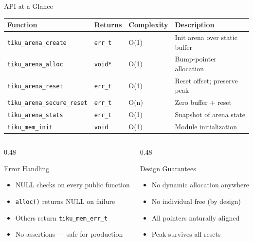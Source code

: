 \documentclass[aspectratio=169, 10pt]{beamer}
\begin{document}
\begin{frame}{API at a Glance}
\begin{table}
\centering
\small
\begin{tabular}{@{}llll@{}}
\toprule
\textbf{Function} & \textbf{Returns} & \textbf{Complexity} & \textbf{Description} \\
\midrule
\texttt{tiku\_arena\_create}  & \texttt{err\_t} & O(1) & Init arena over static buffer \\
\texttt{tiku\_arena\_alloc}   & \texttt{void*}  & O(1) & Bump-pointer allocation \\
\texttt{tiku\_arena\_reset}   & \texttt{err\_t} & O(1) & Reset offset; preserve peak \\
\texttt{tiku\_arena\_secure\_reset} & \texttt{err\_t} & O(n) & Zero buffer + reset \\
\texttt{tiku\_arena\_stats}   & \texttt{err\_t} & O(1) & Snapshot of arena state \\
\texttt{tiku\_mem\_init}      & \texttt{void}   & O(1) & Module initialization \\
\bottomrule
\end{tabular}
\end{table}

\vspace{0.5em}
\begin{columns}[T]
\begin{column}{0.48\textwidth}
\begin{block}{Error Handling}
\begin{itemize}
  \item NULL checks on every public function
  \item \texttt{alloc()} returns NULL on failure
  \item Others return \texttt{tiku\_mem\_err\_t}
  \item No assertions --- safe for production
\end{itemize}
\end{block}
\end{column}
\begin{column}{0.48\textwidth}
\begin{block}{Design Guarantees}
\begin{itemize}
  \item No dynamic allocation anywhere
  \item No individual free (by design)
  \item All pointers naturally aligned
  \item Peak survives all resets
\end{itemize}
\end{block}
\end{column}
\end{columns}
\end{frame}
\end{document}
